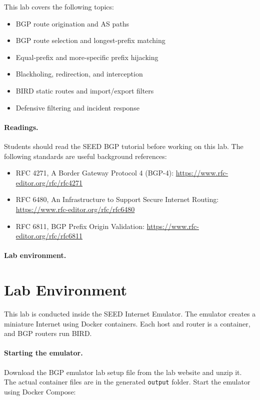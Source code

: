 This lab covers the following topics:

\begin{itemize}[noitemsep]
\item BGP route origination and AS paths
\item BGP route selection and longest-prefix matching
\item Equal-prefix and more-specific prefix hijacking
\item Blackholing, redirection, and interception
\item BIRD static routes and import/export filters
\item Defensive filtering and incident response
\end{itemize}

\paragraph{Readings.}
Students should read the SEED BGP tutorial before working on this lab. The
following standards are useful background references:

\begin{itemize}
\item RFC 4271, A Border Gateway Protocol 4 (BGP-4):
      \url{https://www.rfc-editor.org/rfc/rfc4271}
\item RFC 6480, An Infrastructure to Support Secure Internet Routing:
      \url{https://www.rfc-editor.org/rfc/rfc6480}
\item RFC 6811, BGP Prefix Origin Validation:
      \url{https://www.rfc-editor.org/rfc/rfc6811}
\end{itemize}

\paragraph{Lab environment.}
\seedenvironmentB
\nodependency


\section{Lab Environment}

This lab is conducted inside the SEED Internet Emulator. The emulator creates a
miniature Internet using Docker containers. Each host and router is a container,
and BGP routers run BIRD.

\paragraph{Starting the emulator.}
Download the BGP emulator lab setup file from the lab website and unzip it. The
actual container files are in the generated \texttt{output} folder. Start the
emulator using Docker Compose:

